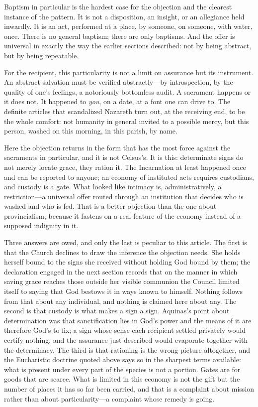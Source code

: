 Baptism in particular is the hardest case for the objection and the clearest instance of the pattern. It is not a disposition, an insight, or an allegiance held inwardly. It is an act, performed at a place, by someone, on someone, with water, once. There is no general baptism; there are only baptisms. And the offer is universal in exactly the way the earlier sections described: not by being abstract, but by being repeatable.

For the recipient, this particularity is not a limit on assurance but its instrument. An abstract salvation must be verified abstractly---by introspection, by the quality of one's feelings, a notoriously bottomless audit. A sacrament happens or it does not. It happened to \emph{you}, on a date, at a font one can drive to. The definite articles that scandalized Nazareth turn out, at the receiving end, to be the whole comfort: not humanity in general invited to a possible mercy, but this person, washed on this morning, in this parish, by name.

Here the objection returns in the form that has the most force against the sacraments in particular, and it is not Celsus's. It is this: determinate signs do not merely locate grace, they ration it. The Incarnation at least happened once and can be reported to anyone; an economy of instituted acts requires custodians, and custody is a gate. What looked like intimacy is, administratively, a restriction---a universal offer routed through an institution that decides who is washed and who is fed. That is a better objection than the one about provincialism, because it fastens on a real feature of the economy instead of a supposed indignity in it.

Three answers are owed, and only the last is peculiar to this article. The first is that the Church declines to draw the inference the objection needs. She holds herself bound to the signs she received without holding God bound by them; the declaration engaged in the next section records that on the manner in which saving grace reaches those outside her visible communion the Council limited itself to saying that God bestows it in ways known to himself. Nothing follows from that about any individual, and nothing is claimed here about any. The second is that custody is what makes a sign a sign. Aquinas's point about determination was that sanctification lies in God's power and the means of it are therefore God's to fix; a sign whose sense each recipient settled privately would certify nothing, and the assurance just described would evaporate together with the determinacy. The third is that rationing is the wrong picture altogether, and the Eucharistic doctrine quoted above says so in the sharpest terms available: what is present under every part of the species is not a portion. Gates are for goods that are scarce. What is limited in this economy is not the gift but the number of places it has so far been carried, and that is a complaint about mission rather than about particularity---a complaint whose remedy is going.

